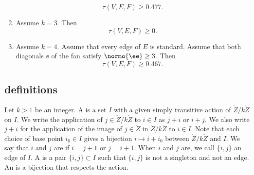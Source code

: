 \begin{theorem}
\begin{enumerate}
\begin{equation}
\tau(V,E,F)\ge 0.477. \tag{check:quad\_pro\_cs}
\end{equation}
\item Assume $k=3$. Then
\begin{equation}
\tau(V,E,F)\ge 0.\tag{check:tri\_std\_cs}
\end{equation}
\item Assume $k=4$.  Assume that every edge of $E$ is standard.
Assume that both diagonals $\ee$ of the fan satisfy $\normo{\ee}\ge3$.
Then
\begin{equation}
\tau(V,E,F)\ge 0.467.\tag{check:quad\_diag\_cs}
\end{equation}
\end{enumerate}
\end{theorem}

%
%


\subsection{definitions}


\begin{definition}
  Let $k>1$ be an integer.  A  is a set $I$ with a
  given simply transitive action of $\ring{Z}/k\ring{Z}$ on $I$.  We
  write the application of $j\in\ring{Z}/k\ring{Z}$ to $i\in I$ as
  $j+i$ or $i+j$.  We also write $j+i$
  for the application of the image of $j\in\ring{Z}$ in $\ring{Z}/k\ring{Z}$ to
  $i\in I$.  Note that each choice of base point $i_0\in I$ gives a
  bijection $i\mapsto i+i_0$ between $\ring{Z}/k\ring{Z}$ and $I$.  
  We say that $i$ and $j$ are  if $i= j+ 1$ or $j=i+1$.
When $i$ and $j$ are, we call $\{i,j\}$ an edge of $I$.
 A  is a pair $\{i,j\}\subset I$
such that $\{i,j\}$ is not a singleton and not an edge.
  An
 is a bijection that respects the action.
%
\end{definition}

